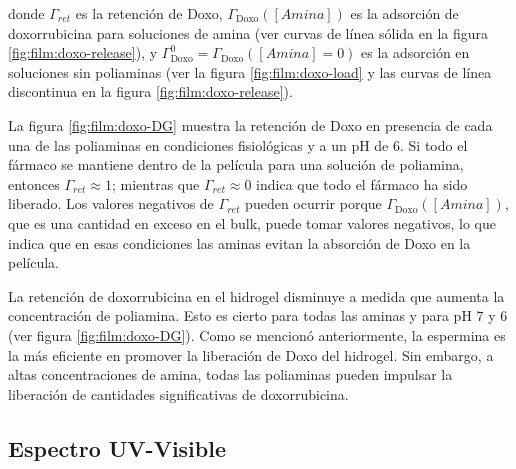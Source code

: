 \noindent donde $\Gamma_{ret}$ es la retenci\'on de Doxo, $\Gamma_\text{Doxo}([Amina])$ es la adsorci\'on de doxorrubicina para soluciones de amina (ver curvas de l\'inea s\'olida en la figura \ref{fig:film:doxo-release}), y $\Gamma_\text{Doxo}^0=\Gamma_\text{Doxo}([Amina]=0)$ es la adsorci\'on en soluciones sin poliaminas (ver la figura \ref{fig:film:doxo-load} y las curvas de l\'inea discontinua en la figura \ref{fig:film:doxo-release}).

La figura \ref{fig:film:doxo-DG} muestra la retenci\'on de Doxo en presencia de cada una de las poliaminas en condiciones fisiol\'ogicas y a un pH de 6. Si todo el f\'armaco se mantiene dentro de la pel\'icula para una soluci\'on de poliamina, entonces $\Gamma_{ret}\approx 1$; mientras que $\Gamma_{ret}\approx 0$ indica que todo el f\'armaco ha sido liberado. Los valores negativos de $\Gamma_{ret}$ pueden ocurrir porque $\Gamma_\text{Doxo}([Amina])$, que es una cantidad en exceso en el bulk, puede tomar valores negativos, lo que indica que en esas condiciones las aminas evitan la absorci\'on de Doxo en la pel\'icula.

La retenci\'on de doxorrubicina en el hidrogel disminuye a medida que aumenta la concentraci\'on de poliamina. Esto es cierto para todas las aminas y para pH 7 y 6 (ver figura \ref{fig:film:doxo-DG}). Como se mencion\'o anteriormente, la espermina es la m\'as eficiente en promover la liberaci\'on de Doxo del hidrogel. Sin embargo, a altas concentraciones de amina, todas las poliaminas pueden impulsar la liberaci\'on de cantidades significativas de doxorrubicina.


\subsection{Espectro UV-Visible}

